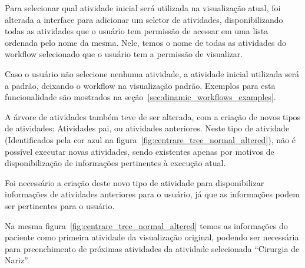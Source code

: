 Para selecionar qual atividade inicial será utilizada na visualização atual, foi alterada a interface para adicionar um seletor de atividades, disponibilizando todas as atividades que o usuário tem permissão de acessar em uma lista ordenada pelo nome da mesma. Nele, temos o nome de todas as atividades do workflow selecionado que o usuário tem a permissão de visualizar.

Caso o usuário não selecione nenhuma atividade, a atividade inicial utilizada será a padrão, deixando o workflow na visualização padrão. Exemplos para esta funcionalidade são mostrados na seção~\ref{sec:dinamic_workflows_examples}.

A árvore de atividades também teve de ser alterada, com a criação de novos tipos de atividades: Atividades pai, ou atividades anteriores. Neste tipo de atividade (Identificados pela cor azul na figura~\ref{fig:centrare_tree_normal_altered}), não é possível executar novas atividades, sendo existentes apenas por motivos de disponibilização de informações pertinentes à execução atual.

Foi necessário a criação deste novo tipo de atividade para disponibilizar informações de atividades anteriores para o usuário, já que as informações podem ser pertinentes para o usuário.

Na mesma figura~\ref{fig:centrare_tree_normal_altered} temos as informações do paciente como primeira atividade da visualização original, podendo ser necessária para preenchimento de próximas atividades da atividade selecionada ``Cirurgia de Nariz''.


